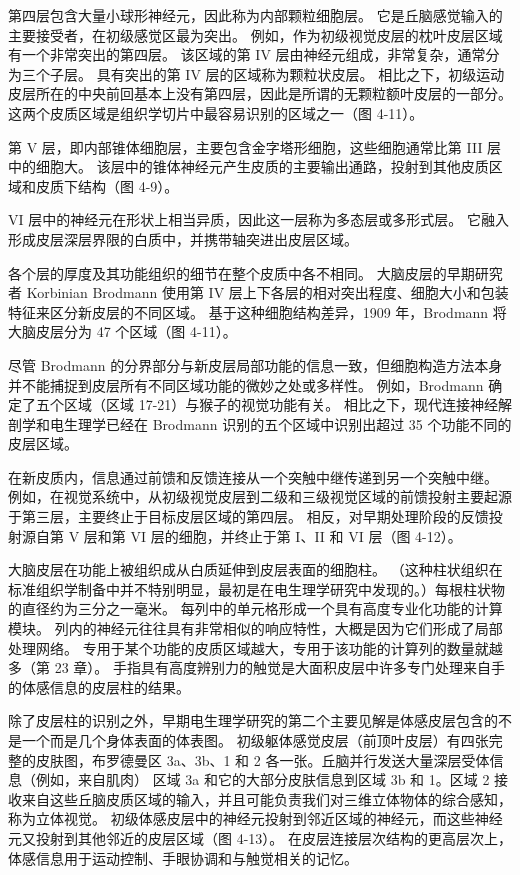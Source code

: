 第四层包含大量小球形神经元，因此称为内部颗粒细胞层。 它是丘脑感觉输入的主要接受者，在初级感觉区最为突出。 例如，作为初级视觉皮层的枕叶皮层区域有一个非常突出的第四层。 该区域的第 IV 层由神经元组成，非常复杂，通常分为三个子层。 具有突出的第 IV 层的区域称为颗粒状皮层。 相比之下，初级运动皮层所在的中央前回基本上没有第四层，因此是所谓的无颗粒额叶皮层的一部分。 这两个皮质区域是组织学切片中最容易识别的区域之一（图 4-11）。

第 V 层，即内部锥体细胞层，主要包含金字塔形细胞，这些细胞通常比第 III 层中的细胞大。 该层中的锥体神经元产生皮质的主要输出通路，投射到其他皮质区域和皮质下结构（图 4-9）。

VI 层中的神经元在形状上相当异质，因此这一层称为多态层或多形式层。 它融入形成皮层深层界限的白质中，并携带轴突进出皮层区域。

各个层的厚度及其功能组织的细节在整个皮质中各不相同。 大脑皮层的早期研究者 Korbinian Brodmann 使用第 IV 层上下各层的相对突出程度、细胞大小和包装特征来区分新皮层的不同区域。 基于这种细胞结构差异，1909 年，Brodmann 将大脑皮层分为 47 个区域（图 4-11）。

尽管 Brodmann 的分界部分与新皮层局部功能的信息一致，但细胞构造方法本身并不能捕捉到皮层所有不同区域功能的微妙之处或多样性。 例如，Brodmann 确定了五个区域（区域 17-21）与猴子的视觉功能有关。 相比之下，现代连接神经解剖学和电生理学已经在 Brodmann 识别的五个区域中识别出超过 35 个功能不同的皮层区域。

在新皮质内，信息通过前馈和反馈连接从一个突触中继传递到另一个突触中继。 例如，在视觉系统中，从初级视觉皮层到二级和三级视觉区域的前馈投射主要起源于第三层，主要终止于目标皮层区域的第四层。 相反，对早期处理阶段的反馈投射源自第 V 层和第 VI 层的细胞，并终止于第 I、II 和 VI 层（图 4-12）。

大脑皮层在功能上被组织成从白质延伸到皮层表面的细胞柱。 （这种柱状组织在标准组织学制备中并不特别明显，最初是在电生理学研究中发现的。）每根柱状物的直径约为三分之一毫米。 每列中的单元格形成一个具有高度专业化功能的计算模块。 列内的神经元往往具有非常相似的响应特性，大概是因为它们形成了局部处理网络。 专用于某个功能的皮质区域越大，专用于该功能的计算列的数量就越多（第 23 章）。 手指具有高度辨别力的触觉是大面积皮层中许多专门处理来自手的体感信息的皮层柱的结果。

除了皮层柱的识别之外，早期电生理学研究的第二个主要见解是体感皮层包含的不是一个而是几个身体表面的体表图。 初级躯体感觉皮层（前顶叶皮层）有四张完整的皮肤图，布罗德曼区 3a、3b、1 和 2 各一张。丘脑并行发送大量深层受体信息（例如，来自肌肉） 区域 3a 和它的大部分皮肤信息到区域 3b 和 1。区域 2 接收来自这些丘脑皮质区域的输入，并且可能负责我们对三维立体物体的综合感知，称为立体视觉。 初级体感皮层中的神经元投射到邻近区域的神经元，而这些神经元又投射到其他邻近的皮层区域（图 4-13）。 在皮层连接层次结构的更高层次上，体感信息用于运动控制、手眼协调和与触觉相关的记忆。

